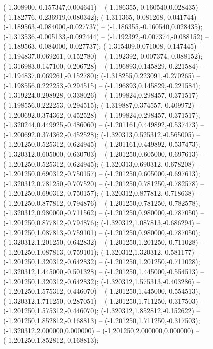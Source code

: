  (-1.308900,-0.157347,0.004641) -- (-1.186355,-0.160540,0.028435) -- (-1.182776,-0.236919,0.080342);
 (-1.311365,-0.081268,-0.041744) -- (-1.189563,-0.084000,-0.027737) -- (-1.186355,-0.160540,0.028435);
 (-1.313536,-0.005133,-0.092444) -- (-1.192392,-0.007374,-0.088152) -- (-1.189563,-0.084000,-0.027737);
 (-1.315409,0.071008,-0.147445) -- (-1.194837,0.069261,-0.152780) -- (-1.192392,-0.007374,-0.088152);
 (-1.316983,0.147100,-0.206728) -- (-1.196893,0.145829,-0.221584) -- (-1.194837,0.069261,-0.152780);
 (-1.318255,0.223091,-0.270265) -- (-1.198556,0.222253,-0.294515) -- (-1.196893,0.145829,-0.221584);
 (-1.319224,0.298928,-0.338026) -- (-1.199824,0.298457,-0.371517) -- (-1.198556,0.222253,-0.294515);
 (-1.319887,0.374557,-0.409972) -- (-1.200692,0.374362,-0.452528) -- (-1.199824,0.298457,-0.371517);
 (-1.320244,0.449925,-0.486060) -- (-1.201161,0.449892,-0.537473) -- (-1.200692,0.374362,-0.452528);
 (-1.320313,0.525312,-0.565005) -- (-1.201250,0.525312,-0.624945) -- (-1.201161,0.449892,-0.537473);
 (-1.320312,0.605000,-0.630703) -- (-1.201250,0.605000,-0.697613) -- (-1.201250,0.525312,-0.624945);
 (-1.320313,0.690312,-0.678208) -- (-1.201250,0.690312,-0.750157) -- (-1.201250,0.605000,-0.697613);
 (-1.320312,0.781250,-0.707520) -- (-1.201250,0.781250,-0.782578) -- (-1.201250,0.690312,-0.750157);
 (-1.320312,0.877812,-0.718638) -- (-1.201250,0.877812,-0.794876) -- (-1.201250,0.781250,-0.782578);
 (-1.320312,0.980000,-0.711562) -- (-1.201250,0.980000,-0.787050) -- (-1.201250,0.877812,-0.794876);
 (-1.320312,1.087813,-0.686294) -- (-1.201250,1.087813,-0.759101) -- (-1.201250,0.980000,-0.787050);
 (-1.320312,1.201250,-0.642832) -- (-1.201250,1.201250,-0.711028) -- (-1.201250,1.087813,-0.759101);
 (-1.320312,1.320312,-0.581177) -- (-1.201250,1.320312,-0.642832) -- (-1.201250,1.201250,-0.711028);
 (-1.320312,1.445000,-0.501328) -- (-1.201250,1.445000,-0.554513) -- (-1.201250,1.320312,-0.642832);
 (-1.320312,1.575313,-0.403286) -- (-1.201250,1.575312,-0.446070) -- (-1.201250,1.445000,-0.554513);
 (-1.320312,1.711250,-0.287051) -- (-1.201250,1.711250,-0.317503) -- (-1.201250,1.575312,-0.446070);
 (-1.320312,1.852812,-0.152622) -- (-1.201250,1.852812,-0.168813) -- (-1.201250,1.711250,-0.317503);
 (-1.320312,2.000000,0.000000) -- (-1.201250,2.000000,0.000000) -- (-1.201250,1.852812,-0.168813);
